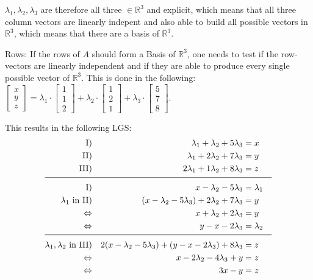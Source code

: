 \documentclass[%
   10pt,              %
   a4paper,           %
   DIV10,             %
]{scrartcl}%
\begin{document}
\begin{itemize}
	$\lambda_1, \lambda_2, \lambda_3$ are therefore all three $\in \mathbb{R}^3$ and explicit, which means that all three column vectors are linearly indepent and also able to build all possible vectors in $\mathbb{R}^3$, which means that there are a basis of $\mathbb{R}^3$.\newline
	
	\noindent Rows: 
	If the rows of $A$ should form a Basis of $\mathbb{R}^3$, one needs to test if the row-vectors are linearly independent and if they are able to produce every single possible vector of $\mathbb{R}^3$. This is done in the following:\newline
	\noindent $\begin{bmatrix}
	x\\
	y\\
	z
	\end{bmatrix} = \lambda_1 \cdot \begin{bmatrix}
	1\\
	1\\
	2
	\end{bmatrix} + \lambda_2 \cdot \begin{bmatrix}
	1\\
	2\\
	1
	\end{bmatrix} + \lambda_3 \cdot \begin{bmatrix}
	5\\
	7\\
	8
	\end{bmatrix}$.\newline\noindent 
	
	This results in the following LGS:\newline\noindent
	\begin{align*}
		\text{I)} && \lambda_1 + \lambda_2 + 5\lambda_3 &= x &&\\
		\text{II)} && \lambda_1 + 2\lambda_2 + 7\lambda_3&= y &&\\
		\text{III)} && 2\lambda_1 + 1\lambda_2 + 8\lambda_3&= z &&\\[-1.7ex]
		\cline{1-6}
		\text{I)} && x - \lambda_2 - 5\lambda_3 &=\lambda_1 &&\\
		\text{$\lambda_1$ in II)} && (x - \lambda_2 - 5\lambda_3) + 2\lambda_2 + 7\lambda_3 &= y\\
		\text{$\Leftrightarrow$} && x+ \lambda_2 + 2\lambda_3 &= y\\
		\text{$\Leftrightarrow$} && y - x -2\lambda_3 &= \lambda_2&&\\[-1.7ex]
		\cline{1-6}
		\text{$\lambda_1, \lambda_2$ in III)} &&  2(x- \lambda_2 -5\lambda_3) + (y - x - 2\lambda_3) + 8 \lambda_3 &= z\\
		\text{$\Leftrightarrow$} && x - 2\lambda_2 - 4\lambda_3 + y &=z\\
		\text{$\Leftrightarrow$} && 3x - y&= z\\
	\end{align*}
	

\end{itemize}
\end{document}
